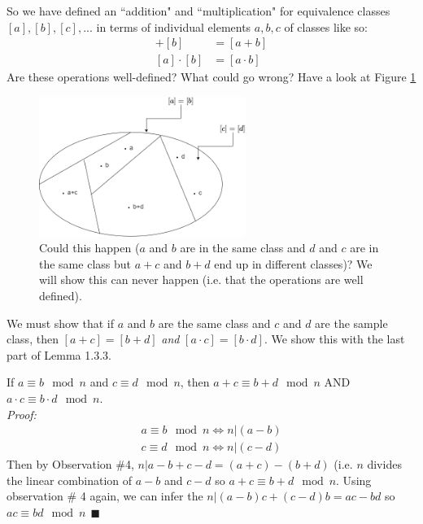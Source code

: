 \noindent So we have defined an ``addition" and ``multiplication" for equivalence classes  $[a],[b],[c], ...$ in terms of individual elements $a,b,c$  of classes like so:
\begin{align}
    [a]+[b]&=[a+b] \nonumber \\
    [a]\cdot[b]&=[a\cdot b] \nonumber
\end{align}
Are these operations well-defined?  What could go wrong? Have a look at Figure \ref{fig:Bad_partition}\steezybreak\\
\newpage
\begin{figure}[h!]
    \centering
    \includegraphics[width=0.6\textwidth]{Figures/partitin_equiv_example.png}
    \caption{Could this happen ($a$ and $b$ are in the same class and $d$ and $c$ are in the same class but $a+c$ and $b+d$ end up in different classes)? We will show this can never happen (i.e. that the operations are well defined).}
    \label{fig:Bad_partition}
\end{figure}

\noindent We must show that if $a$ and $b$ are the same class and $c$ and $d$ are the sample class, then $[a+c]=[b+d]$ \textit{and} $[a\cdot c]=[b\cdot d]$. We show this with the last part of Lemma 1.3.3.
\setcounter{dummy_lemma}{2}
\begin{lemma}[Part 3]
If $a\equiv b\mod n$ and $c\equiv d\mod n$, then $a+c\equiv b+d\mod n$ AND $a\cdot c\equiv b\cdot d \mod n$.\\
\textit{Proof:}
\begin{align}
a\equiv b\mod n \iff n |(a-b)\nonumber\\
c\equiv d\mod n \iff n |(c-d)\nonumber
\end{align}
Then by Observation \#4, $n|a-b+c-d=(a+c)-(b+d)$ (i.e. $n$ divides the linear combination of $a-b$ and $c-d$ so $a+c\equiv b+d\mod n$. Using observation \# 4 again, we can infer the $n|(a-b)c+(c-d)b=ac-bd$ so $ac\equiv bd\mod n \ \ \blacksquare$\\
\end{lemma}

